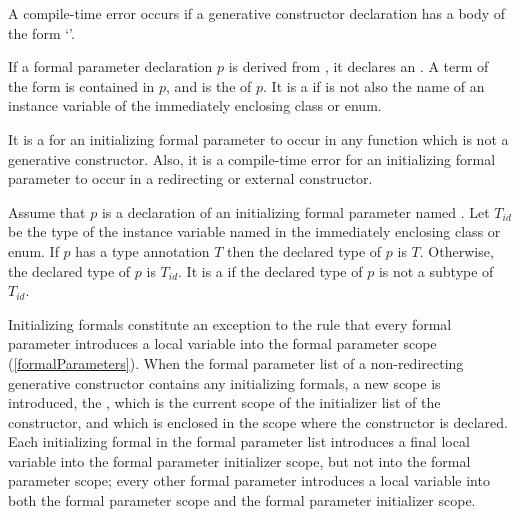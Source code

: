 \documentclass[makeidx]{article}
\begin{document}
\LMHash{}%
A compile-time error occurs if a generative constructor declaration
has a body of the form `'.


\LMHash{}%
If a formal parameter declaration $p$ is derived from
,
it declares an .
A term of the form  is contained in $p$,
and \id{} is the  of $p$.
It is a  if \id{} is not also the name of
an instance variable of the immediately enclosing class or enum.

\LMHash{}%
It is a  for an initializing formal parameter
to occur in any function which is not a generative constructor.
Also, it is a compile-time error for an initializing formal parameter
to occur in a redirecting or external constructor.

\LMHash{}%
Assume that $p$ is a declaration of an initializing formal parameter named \id.
Let $T_{id}$ be the type of the instance variable named \id{} in
the immediately enclosing class or enum.
If $p$ has a type annotation $T$ then the declared type of $p$ is $T$.
Otherwise, the declared type of $p$ is $T_{id}$.
It is a  if the declared type of $p$
is not a subtype of $T_{id}$.

\LMHash{}%
Initializing formals constitute an exception to the rule that
every formal parameter introduces a local variable into
the formal parameter scope (\ref{formalParameters}).
When the formal parameter list of a non-redirecting generative constructor
contains any initializing formals, a new scope is introduced, the
,
which is the current scope of the initializer list of the constructor,
and which is enclosed in the scope where the constructor is declared.
Each initializing formal in the formal parameter list
introduces a final local variable into the formal parameter initializer scope,
but not into the formal parameter scope;
every other formal parameter introduces a local variable into
both the formal parameter scope and the formal parameter initializer scope.
\end{document}
